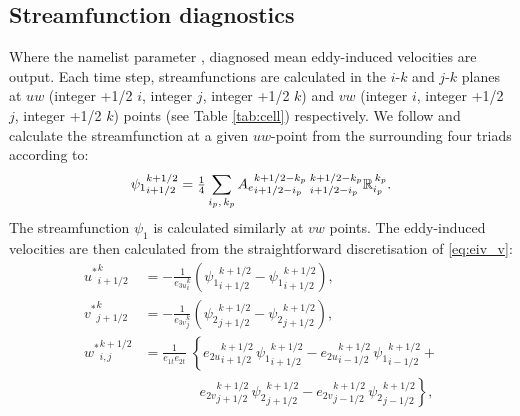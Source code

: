 \documentclass[../main/NEMO_manual]{subfiles}
\begin{document}
\subsection{Streamfunction diagnostics}
\label{sec:sfdiag}

Where the namelist parameter ,
diagnosed mean eddy-induced velocities are output.
Each time step, streamfunctions are calculated in the $i$-$k$ and $j$-$k$ planes at
$uw$ (integer +1/2 $i$, integer $j$, integer +1/2 $k$) and $vw$ (integer $i$, integer +1/2 $j$, integer +1/2 $k$)
points (see Table \autoref{tab:cell}) respectively.
We follow \citep{Griffies_Bk04} and calculate the streamfunction at a given $uw$-point from
the surrounding four triads according to:
\[
  {\psi_1}_{i+1/2}^{k+1/2}={\textstyle\frac{1}{4}}\sum_{\substack{i_p,\,k_p}}
  {A_e}_{i+1/2-i_p}^{k+1/2-k_p}\:{}_{i+1/2-i_p}^{k+1/2-k_p}{\mathbb{R}}_{i_p}^{\,k_p}.
\]
The streamfunction $\psi_1$ is calculated similarly at $vw$ points.
The eddy-induced velocities are then calculated from the straightforward discretisation of \autoref{eq:eiv_v}:
\[
  \begin{split}
    {u^*}_{i+1/2}^{k} & = - \frac{1}{{e_{3u}}_{i}^{k}}\left({\psi_1}_{i+1/2}^{k+1/2}-{\psi_1}_{i+1/2}^{k+1/2}\right),   \\
    {v^*}_{j+1/2}^{k} & = - \frac{1}{{e_{3v}}_{j}^{k}}\left({\psi_2}_{j+1/2}^{k+1/2}-{\psi_2}_{j+1/2}^{k+1/2}\right),   \\
    {w^*}_{i,j}^{k+1/2} & =    \frac{1}{e_{1t}e_{2t}}\; \left\{
      {e_{2u}}_{i+1/2}^{k+1/2} \,{\psi_1}_{i+1/2}^{k+1/2} -
      {e_{2u}}_{i-1/2}^{k+1/2} \,{\psi_1}_{i-1/2}^{k+1/2} \right. + \\
    \phantom{=} & \qquad\qquad\left. {e_{2v}}_{j+1/2}^{k+1/2} \,{\psi_2}_{j+1/2}^{k+1/2} - {e_{2v}}_{j-1/2}^{k+1/2} \,{\psi_2}_{j-1/2}^{k+1/2} \right\},
  \end{split}
\]

\biblio
\end{document}
